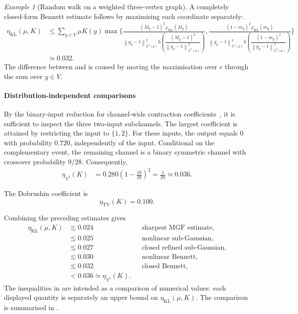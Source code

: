 \documentclass[11pt]{article}
\theoremstyle{plain}
\theoremstyle{remark}
\newtheorem{example}{Example}
\begin{document}
\begin{example}[Random walk on a weighted three-vertex graph]
A completely closed-form Bennett estimate follows by maximising each
coordinate separately:
\begin{align}
\eta_{\mathrm{KL}}(\mu,K)
&\leq
\sum_{y\in V}
\mu K(y)
\max\Bigg\{
\frac{
(M_y-1)^2\varphi_{\mathrm{KL}}(M_y)
}{
\left\lVert g_y-1\right\rVert_{L^2(\mu)}^2
h\left(
\dfrac{(M_y-1)^2}{
\left\lVert g_y-1\right\rVert_{L^2(\mu)}^2
}
\right)
},
\frac{
(1-m_y)^2\varphi_{\mathrm{KL}}(m_y)
}{
\left\lVert g_y-1\right\rVert_{L^2(\mu)}^2
h\left(
\dfrac{(1-m_y)^2}{
\left\lVert g_y-1\right\rVert_{L^2(\mu)}^2
}
\right)
}
\Bigg\}
\nonumber\\
&\simeq
0.032.
\label{eq:biasedRefreshmentClosedBennett}
\end{align}
The difference between
 and
 is caused by moving the
maximisation over $c$ through the sum over $y\in V$.

\paragraph*{Distribution-independent comparisons}
By the binary-input reduction for channel-wide contraction
coefficients~\cite{ordentlichPolyanskiyBinaryInputs}, it is sufficient
to inspect the three two-input subchannels. The largest coefficient is
attained by restricting the input to $\{1,2\}$. For these inputs, the
output equals $0$ with probability $0.720$, independently of the input.
Conditional on the complementary event, the remaining channel is a
binary symmetric channel with crossover probability $9/28$.
Consequently,
\begin{align}
\eta_{\chi^2}(K)
&=
0.280
\left(
1-\frac{18}{28}
\right)^2 = 
\frac{1}{28}
\simeq 
0.036.
\label{eq:biasedRefreshmentChannelChiSquare}
\end{align}

The Dobrushin coefficient is
\begin{equation}
\eta_{\mathrm{TV}}(K)
=
0.100.
\label{eq:biasedRefreshmentTV}
\end{equation}

Combining the preceding estimates gives
\begin{align}
\eta_{\mathrm{KL}}(\mu,K)
&\lesssim 
0.024
&&\text{sharpest MGF estimate},
\nonumber\\
&\lesssim
0.025
&&\text{nonlinear sub-Gaussian},
\nonumber\\
&\lesssim
0.027
&&\text{closed refined sub-Gaussian},
\nonumber\\
&\lesssim
0.030
&&\text{nonlinear Bennett},
\nonumber\\
&\lesssim
0.032
&&\text{closed Bennett},
\nonumber\\
&<
0.036
\simeq 
\eta_{\chi^2}(K).
\label{eq:biasedRefreshmentComparisonChain}
\end{align}
The inequalities in
 are intended as a comparison
of numerical values: each displayed quantity is separately an upper
bound on $\eta_{\mathrm{KL}}(\mu,K)$. The comparison is summarised in
. 
\end{example}
\end{document}
